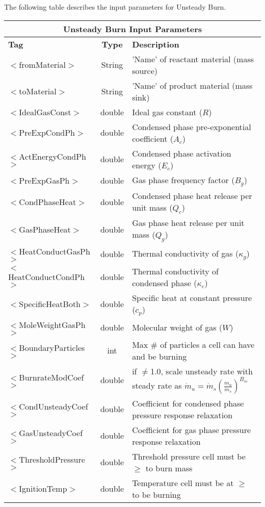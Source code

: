 The following table describes the input parameters for Unsteady Burn.

\begin{center}
\begin{tabular}{| l | c | p{7cm} |}
\hline  
  \multicolumn{3}{|c|}{\textbf{Unsteady Burn Input Parameters}} \\
\hline
\hline
  \textbf{Tag} & \textbf{Type} & \textbf{Description}\\
\hline
  $<$fromMaterial$>$ & String & 'Name' of reactant material (mass source)\\
\hline
  $<$toMaterial$>$ & String & 'Name' of product material (mass sink)\\
\hline
  $<$IdealGasConst$>$ & double & Ideal gas constant ($R$)\\
\hline
  $<$PreExpCondPh$>$ & double & Condensed phase pre-exponential coefficient ($A_c$) \\
\hline
  $<$ActEnergyCondPh$>$ & double & Condensed phase activation energy ($E_c$)\\
\hline
  $<$PreExpGasPh$>$ & double & Gas phase frequency factor ($B_g$)\\
\hline
  $<$CondPhaseHeat$>$ & double & Condensed phase heat release per unit mass ($Q_c$)\\
\hline
  $<$GasPhaseHeat$>$ & double & Gas phase heat release per unit mass ($Q_g$)\\
\hline
  $<$HeatConductGasPh$>$ & double & Thermal conductivity of gas ($\kappa_g$)\\
\hline
  $<$HeatConductCondPh$>$ & double & Thermal conductivity of condensed phase ($\kappa_c$)\\
\hline
  $<$SpecificHeatBoth$>$ & double & Specific heat at constant pressure ($c_p$)\\
\hline
  $<$MoleWeightGasPh$>$ & double & Molecular weight of gas ($W$)\\
\hline
  $<$BoundaryParticles$>$ & int & Max \# of particles a cell can have and be burning\\
\hline
  $<$BurnrateModCoef$>$ & double & if $\neq$1.0, scale unsteady rate with steady rate as $\dot{m}_u=\dot{m}_s\left(\frac{\displaystyle\dot{m}_u}{\displaystyle\dot{m}_s}\right)^{B_m}$\\
\hline
  $<$CondUnsteadyCoef$>$ & double & Coefficient for condensed phase pressure response relaxation \\
\hline
  $<$GasUnsteadyCoef$>$ & double & Coefficient for gas phase pressure response relaxation \\
\hline
  $<$ThresholdPressure$>$ & double & Threshold pressure cell must be $\ge$ to burn mass\\
\hline
  $<$IgnitionTemp$>$ & double & Temperature cell must be at $\ge$ to be burning\\
\hline
\end{tabular}
\end{center}

